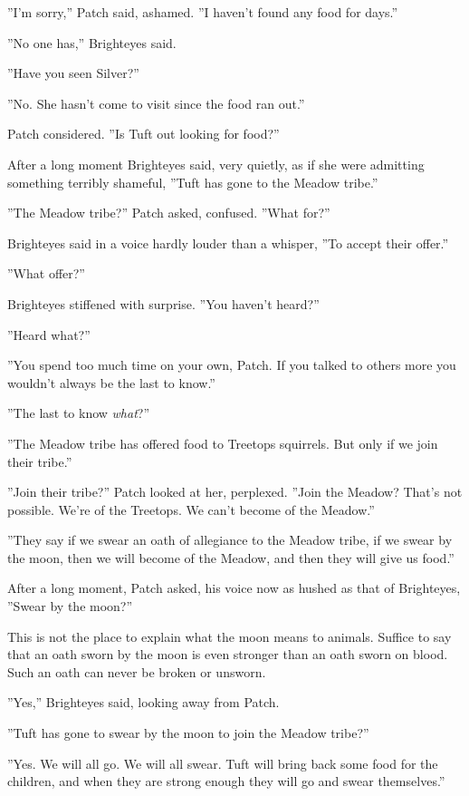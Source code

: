 \documentclass[12pt]{book}
\begin{document}
''I'm sorry,'' Patch said, ashamed. ''I haven't found any food for days.''\par
 ''No one has,'' Brighteyes said.\par
 ''Have you seen Silver?''\par
 ''No. She hasn't come to visit since the food ran out.''\par
 Patch considered. ''Is Tuft out looking for food?''\par
 After a long moment Brighteyes said, very quietly, as if she were admitting something terribly shameful, ''Tuft has gone to the Meadow tribe.''\par
 ''The Meadow tribe?'' Patch asked, confused. ''What for?''\par
 Brighteyes said in a voice hardly louder than a whisper, ''To accept their offer.''\par
 ''What offer?''\par
 Brighteyes stiffened with surprise. ''You haven't heard?''\par
 ''Heard what?''\par
 ''You spend too much time on your own, Patch. If you talked to others more you wouldn't always be the last to know.''\par
 ''The last to know {\it what}?''\par
 ''The Meadow tribe has offered food to Treetops squirrels. But only if we join their tribe.''\par
 ''Join their tribe?'' Patch looked at her, perplexed. ''Join the Meadow? That's not possible. We're of the Treetops. We can't become of the Meadow.''\par
 ''They say if we swear an oath of allegiance to the Meadow tribe, if we swear by the moon, then we will become of the Meadow, and then they will give us food.''\par
 After a long moment, Patch asked, his voice now as hushed as that of Brighteyes, ''Swear by the moon?''\par
This is not the place to explain what the moon means to animals. Suffice to say that an oath sworn by the moon is even stronger than an oath sworn on blood. Such an oath can never be broken or unsworn.\par
 ''Yes,'' Brighteyes said, looking away from Patch.\par
 ''Tuft has gone to swear by the moon to join the Meadow tribe?''\par
 ''Yes. We will all go. We will all swear. Tuft will bring back some food for the children, and when they are strong enough they will go and swear themselves.''\par
\end{document}
